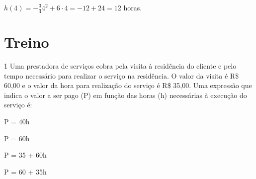 \begin{escolha}
\begin{boxmedio}
\begin{boxmedio}
{\begin{boxpeq}
\begin{boxpeq}
{\begin{boxpeq}
\begin{boxmedio}
\begin{boxmedio}
\begin{boxpeq}
\begin{boxmedio}
\begin{boxpeq}
\begin{boxpeq}
\begin{boxpeq}
\begin{boxpeq}
\begin{boxmedio}
{\begin{boxmedio}
\begin{boxmedio}
\begin{boxpeq}
\begin{boxmedio}
\begin{boxpeq}
\begin{boxpeq}
\begin{boxpeq}
\begin{escolha}
{\begin{boxmedio}
\begin{boxpeq}
\begin{boxpeq}
\begin{boxpeq}
\begin{boxpeq}
\begin{boxpeq}
\begin{boxmedio}
\begin{boxpeq}
\begin{boxpeq}
\begin{boxpeq}
{\begin{boxpeq}
\begin{boxmedio}
\begin{boxpeq}
\begin{boxpeq}
\begin{boxpeq}
{\begin{boxpeq}
\begin{boxmedio}
{\begin{boxpeq}
\begin{boxpeq}
\begin{boxmedio}
\begin{boxmedio}
\begin{boxpeq}
\begin{boxpeq}
{\begin{boxpeq}
{$ h(4) = - \frac{3}{4}4^{2} + 6 \cdot 4 = - 12 + 24 = 12$ horas.}

\section{Treino}

\num{1} Uma prestadora de serviços cobra pela visita à residência do
cliente e pelo tempo necessário para realizar o serviço na residência. O
valor da visita é R\$ 60,00 e o valor da hora para realização do serviço é
R\$ 35,00. Uma expressão que indica o valor a ser pago (P) em função das
horas (h) necessárias à execução do serviço é:

\begin{escolha}

  \item P = 40h

  \item P = 60h

  \item P = 35 + 60h

  \item P = 60 + 35h

\end{escolha}

\end{boxpeq}}
\end{boxpeq}
\end{boxpeq}
\end{boxmedio}
\end{boxmedio}
\end{boxpeq}
\end{boxpeq}}
\end{boxmedio}
\end{boxpeq}}
\end{boxpeq}
\end{boxpeq}
\end{boxpeq}
\end{boxmedio}
\end{boxpeq}}
\end{boxpeq}
\end{boxpeq}
\end{boxpeq}
\end{boxmedio}
\end{boxpeq}
\end{boxpeq}
\end{boxpeq}
\end{boxpeq}
\end{boxpeq}
\end{boxmedio}}
\end{escolha}
\end{boxpeq}
\end{boxpeq}
\end{boxpeq}
\end{boxmedio}
\end{boxpeq}
\end{boxmedio}
\end{boxmedio}}
\end{boxmedio}
\end{boxpeq}
\end{boxpeq}
\end{boxpeq}
\end{boxpeq}
\end{boxmedio}
\end{boxpeq}
\end{boxmedio}
\end{boxmedio}
\end{boxpeq}}
\end{boxpeq}
\end{boxpeq}}
\end{boxmedio}
\end{boxmedio}
\end{escolha}
